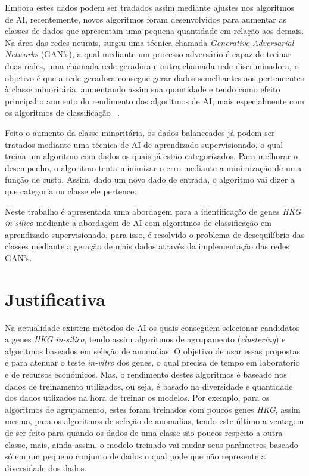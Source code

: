 \documentclass[
	12pt,				%
	openright,			%
	oneside,			%
	a4paper,			%
	english,			%
	brazil				%
	]{abntex2}
\begin{document}
Embora estes dados podem ser tradados assim mediante ajustes nos algoritmos de AI, recentemente, novos algoritmos foram desenvolvidos para aumentar as classes de dados que apresentam uma pequena quantidade em relação aos demais. Na área das redes neurais, surgiu uma técnica chamada \textit{Generative Adversarial Networks} (GAN's), a qual mediante um processo adversário é capaz de treinar duas redes, uma chamada rede geradora e outra chamada rede discriminadora, o objetivo é que a rede geradora consegue gerar dados semelhantes aos pertencentes à classe minoritária, aumentando assim sua quantidade e tendo como efeito principal o aumento do rendimento dos algoritmos de AI, mais especialmente com os algoritmos de classificação ~\cite{goodfellow2014generative}.

Feito o aumento da classe minoritária, os dados balanceados já podem ser tratados mediante uma técnica de AI de aprendizado supervisionado, o qual treina um algoritmo com dados os quais já estão categorizados. Para melhorar o desempenho, o algoritmo tenta minimizar o erro mediante a minimização de uma função de custo. Assim, dado um novo dado de entrada, o algoritmo vai dizer a que categoria ou classe ele pertence.

Neste trabalho é apresentada uma abordagem para a identificação de genes \textit{HKG in-silico} mediante a abordagem de AI com algoritmos de classificação em aprendizado supervisionado, para isso, é resolvido o problema de desequilíbrio das classes mediante a geração de mais dados através da implementação das redes GAN's.


\section{Justificativa}

Na actualidade existem métodos de AI os quais conseguem selecionar candidatos a genes \textit{HKG in-silico}, tendo assim algoritmos de agrupamento (\textit{clustering}) e algoritmos baseados em seleção de anomalias. O objetivo de usar essas propostas é para atenuar o teste \textit{in-vitro} dos genes, o qual precisa de tempo em laboratorio e de recursos económicos. Mas, o rendimento destes algoritmos é baseado nos dados de treinamento utilizados, ou seja, é basado na diversidade e quantidade dos dados utlizados na hora de treinar os modelos. Por exemplo, para os algoritmos de agrupamento, estes foram treinados com poucos genes \textit{HKG}, assim mesmo, para os algoritmos de seleção de anomalias, tendo este último a ventagem de ser feito para quando os dados de uma classe são poucos respeito a outra classe, mais, ainda assim, o modelo treinado vai mudar seus parâmetros baseado só em um pequeno conjunto de dados o qual pode que não represente a diversidade dos dados.
\end{document}
